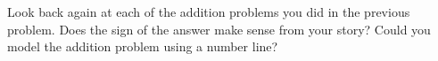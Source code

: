 \documentclass{ximera}
\begin{document}
\begin{question}
Look back again at each of the addition problems you did in the previous problem.  Does the sign of the answer make sense from your story?  Could you model the addition problem using a number line?

\end{question}
\end{document}
